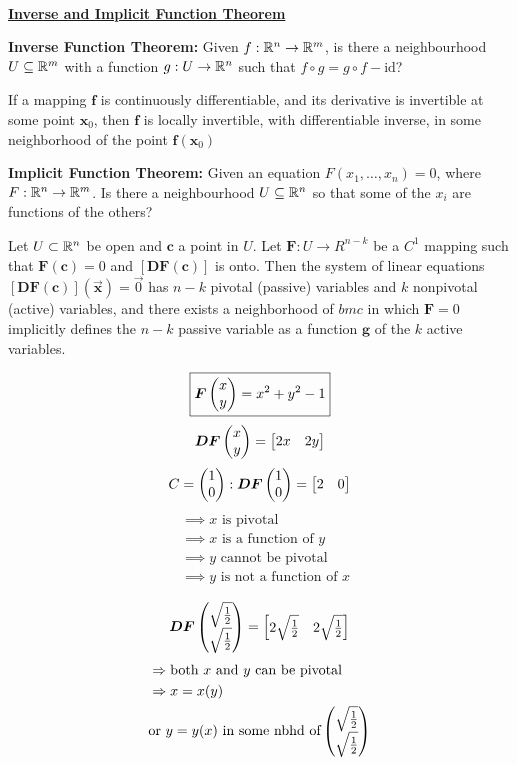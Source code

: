 \\

\ul{\textbf{Inverse and Implicit Function Theorem}}

\textbf{Inverse Function Theorem:} Given $f : \mathbb{R}^n \to \mathbb{R}^m$, is there a neighbourhood $U\subseteq \mathbb{R}^m$ with a function $g : U \to \mathbb{R}^n$ such that $f\circ g = g\circ f - \mathrm{id}$?

\begin{theorem}
  If a mapping $\bm{f}$ is continuously differentiable, and its derivative is invertible at some point $\bm{x}_0$, then $\bm{f}$ is locally invertible, with differentiable inverse, in some neighborhood of the point $\bm{f}(\bm{x}_0)$
\end{theorem}

\textbf{Implicit Function Theorem:} Given an equation $F(x_1, \dots, x_n) = 0$, where $F : \mathbb{R}^n \to \mathbb{R}^m$. Is there a neighbourhood $U \subseteq \mathbb{R}^n$ so that some of the $x_i$ are functions of the others?

\begin{theorem}
  Let $U\subset \mathbb{R}^n$ be open and $\bm{c}$ a point in $U$. Let $\bm{F} : U \to R^{n-k}$ be a $C^1$ mapping such that $\bm{F}(\bm{c})=0$ and $[\bm{DF}(\bm{c})]$ is onto. Then the system of linear equations $[\bm{DF}(\bm{c})](\vec{\bm{x}})=\vec{0}$ has $n-k$ pivotal (passive) variables and $k$ nonpivotal (active) variables, and there exists a neighborhood of $bm{c}$ in which $\bm{F}=0$ implicitly defines the $n-k$ passive variable as a function $\bm{g}$ of the $k$ active variables.
\end{theorem}

\example
\[\boxed{\bm{F}\begin{pmatrix} x \\ y \end{pmatrix} = x^2 + y^2 -1}\]
\[\bm{DF}\begin{pmatrix} x \\ y \end{pmatrix} = \begin{bmatrix} 2x & 2y \end{bmatrix}\]
\[C = \begin{pmatrix} 1 \\ 0 \end{pmatrix} : \bm{DF}\begin{pmatrix} 1 \\ 0 \end{pmatrix}=\begin{bmatrix} 2 & 0 \end{bmatrix}\]
\begin{align*}
  &\implies \text{$x$ is pivotal} \\
  &\implies \text{$x$ is a function of $y$} \\
  &\implies \text{$y$ cannot be pivotal} \\
  &\implies \text{$y$ is not a function of $x$}
\end{align*}

\[\bm{DF}\begin{pmatrix} \sqrt{\frac{1}{2}} \\ \sqrt{\frac{1}{2}} \end{pmatrix}=\begin{bmatrix} 2\sqrt{\frac{1}{2}} & 2\sqrt{\frac{1}{2}} \end{bmatrix}\]
\begin{align*}
  &\Rightarrow \text{both $x$ and $y$ can be pivotal} \\
  &\Rightarrow x = x(y) \\
  &\text{or $y = y(x)$ in some nbhd of} \begin{pmatrix} \sqrt{\frac{1}{2}} \\ \sqrt{\frac{1}{2}} \end{pmatrix}
\end{align*}

